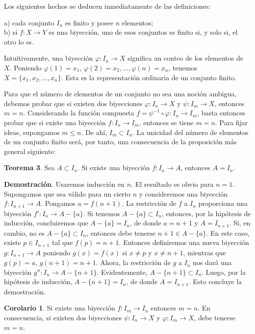\documentclass[12pt,oneside]{book}
\begin{document}
Los siguientes hechos se deducen inmediatamente de las definiciones:

a) cada conjunto \(I_n\) es finito y posee \(n\) elementos;\\
b) si \(f: X \to Y\) es una biyección, uno de esos conjuntos es finito si, y solo si, el otro lo es.

Intuitivamente, una biyección \(\varphi: I_n \to X\) significa un conteo de los elementos de \(X\). Poniendo \(\varphi(1) = x_1\), \(\varphi(2) = x_2, \dots, \varphi(n) = x_n\), tenemos \(X = \{x_1, x_2, \dots, x_n\}\). Esta es la representación ordinaria de un conjunto finito.

Para que el número de elementos de un conjunto no sea una noción ambigua, debemos probar que si existen dos biyecciones \(\varphi: I_n \to X\) y \(\psi: I_m \to X\), entonces \(m = n\). Considerando la función compuesta \(f = \psi^{-1} \circ \varphi: I_n \to I_m\), basta entonces probar que si existe una biyección \(f: I_n \to I_m\), entonces se tiene \(m = n\). Para fijar ideas, supongamos \(m \le n\). De ahí, \(I_m \subset I_n\). La unicidad del número de elementos de un conjunto finito será, por tanto, una consecuencia de la proposición más general siguiente:

\textbf{Teorema 3}. Sea \(A \subset I_n\). Si existe una biyección \(f: I_n \to A\), entonces \(A = I_n\).

\textbf{Demostración}. Usaremos inducción en \(n\). El resultado es obvio para \(n = 1\). Supongamos que sea válido para un cierto \(n\) y consideremos una biyección \(f: I_{n+1} \to A\). Pongamos \(a = f(n + 1)\). La restricción de \(f\) a \(I_n\) proporciona una biyección \(f': I_n \to A - \{a\}\). Si tenemos \(A - \{a\} \subset I_n\), entonces, por la hipótesis de inducción, concluiremos que \(A - \{a\} = I_n\), de donde \(a = n + 1\) y \(A = I_{n+1}\). Si, en cambio, no es \(A - \{a\} \subset I_n\), entonces debe tenerse \(n + 1 \in A - \{a\}\). En este caso, existe \(p \in I_{n+1}\) tal que \(f(p) = n + 1\). Entonces definiremos una nueva biyección \(g: I_{n+1} \to A\) poniendo \(g(x) = f(x)\) si \(x \neq p\) y \(x \neq n + 1\), mientras que \(g(p) = a\), \(g(n + 1) = n + 1\). Ahora, la restricción de \(g\) a \(I_n\) nos dará una biyección \(g'': I_n \to A - \{n + 1\}\). Evidentemente, \(A - \{n + 1\} \subset I_n\). Luego, por la hipótesis de inducción, \(A - \{n + 1\} = I_n\), de donde \(A = I_{n+1}\). Esto concluye la demostración.

\textbf{Corolario 1}. Si existe una biyección \(f: I_m \to I_n\) entonces \(m = n\). En consecuencia, si existen dos biyecciones \(\psi: I_n \to X\) y \(\varphi: I_m \to X\), debe tenerse \(m = n\).
\end{document}
